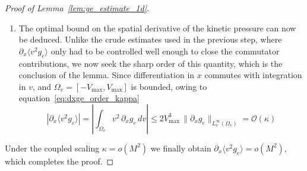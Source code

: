 \documentclass[pdflatex,final,10pt]{article}
\newcommand{\Del}[1]{#1}
\begin{document}
\begin{proof}[Proof of Lemma~\ref{lem:ge_estimate_1d}]
\begin{enumerate}
Repeating the same substitution in \eqref{eq:dx_equation}, where the commutator
term is likewise reduced to
$\frac{\kappa}{M}\,\mathcal{O}(\kappa/M) = o(\kappa)$ and the term
$-(\partial_x\nu_{ee})g_e$ is $\mathcal{O}(\kappa)$ by
\eqref{eq:ge_order_kappa}, we obtain
\begin{equation} \label{eq:dxge_order_kappa}
    \partial_x g_e = \mathcal{O}(\kappa)
    \quad \text{uniformly in } L^\infty_v(\Omega_v).
\end{equation}
Assumption~(iv) guarantees that this
quasi-stationary balance also holds at $t = 0$: for data that are not well
prepared, the homogeneous dynamics
$\partial_t g_e = -\nu_{ee}\,g_e/\kappa$ would first relax $g_e$ towards
$\mathcal{O}(\kappa)$ over the short time $t \sim \kappa/\nu_{ee}$, and
\eqref{eq:ge_order_kappa} would only hold outside that initial layer.
\item \Del{The optimal bound on the spatial derivative of the kinetic pressure can
now be deduced. Unlike the crude estimates used in the previous step, where
$\partial_x\langle v^2 g_e\rangle$ only had to be controlled well enough to
close the commutator contributions, we now seek the sharp order of this
quantity, which is the conclusion of the lemma.}
Since differentiation in $x$ commutes with integration in $v$, and
$\Omega_v = [-V_{\max}, V_{\max}]$ is bounded, owing to equation~\eqref{eq:dxge_order_kappa}
\begin{equation*}
    \left| \partial_x \langle v^2 g_e \rangle \right|
    = \left| \int_{\Omega_v} v^2\, \partial_x g_e \, dv \right|
    \le 2 V_{\max}^3\,
        \|\partial_x g_e\|_{L^\infty_v(\Omega_v)}
    = \mathcal{O}(\kappa)
\end{equation*}
\end{enumerate}

Under the coupled scaling $\kappa = o(M^2)$ we
finally obtain $\partial_x \langle v^2 g_e \rangle = o(M^2)$, which completes
the proof.
\end{proof}
\end{document}
